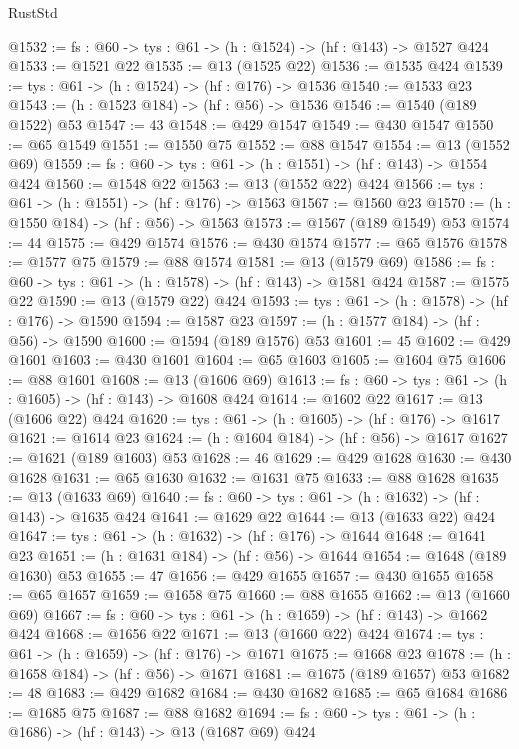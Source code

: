 \begin{lexlean}{RustStd}
\begin{coremodule}
@1532 := {fs : @60} -> {tys : @61} -> (h : @1524) -> (hf : @143) -> @1527 @424
@1533 := @1521 @22
@1535 := @13 (@1525 @22)
@1536 := @1535 @424
@1539 := {tys : @61} -> (h : @1524) -> (hf : @176) -> @1536
@1540 := @1533 @23
@1543 := (h : @1523 @184) -> (hf : @56) -> @1536
@1546 := @1540 (@189 @1522) @53
@1547 := 43
@1548 := @429 @1547
@1549 := @430 @1547
@1550 := @65 @1549
@1551 := @1550 @75
@1552 := @88 @1547
@1554 := @13 (@1552 @69)
@1559 := {fs : @60} -> {tys : @61} -> (h : @1551) -> (hf : @143) -> @1554 @424
@1560 := @1548 @22
@1563 := @13 (@1552 @22) @424
@1566 := {tys : @61} -> (h : @1551) -> (hf : @176) -> @1563
@1567 := @1560 @23
@1570 := (h : @1550 @184) -> (hf : @56) -> @1563
@1573 := @1567 (@189 @1549) @53
@1574 := 44
@1575 := @429 @1574
@1576 := @430 @1574
@1577 := @65 @1576
@1578 := @1577 @75
@1579 := @88 @1574
@1581 := @13 (@1579 @69)
@1586 := {fs : @60} -> {tys : @61} -> (h : @1578) -> (hf : @143) -> @1581 @424
@1587 := @1575 @22
@1590 := @13 (@1579 @22) @424
@1593 := {tys : @61} -> (h : @1578) -> (hf : @176) -> @1590
@1594 := @1587 @23
@1597 := (h : @1577 @184) -> (hf : @56) -> @1590
@1600 := @1594 (@189 @1576) @53
@1601 := 45
@1602 := @429 @1601
@1603 := @430 @1601
@1604 := @65 @1603
@1605 := @1604 @75
@1606 := @88 @1601
@1608 := @13 (@1606 @69)
@1613 := {fs : @60} -> {tys : @61} -> (h : @1605) -> (hf : @143) -> @1608 @424
@1614 := @1602 @22
@1617 := @13 (@1606 @22) @424
@1620 := {tys : @61} -> (h : @1605) -> (hf : @176) -> @1617
@1621 := @1614 @23
@1624 := (h : @1604 @184) -> (hf : @56) -> @1617
@1627 := @1621 (@189 @1603) @53
@1628 := 46
@1629 := @429 @1628
@1630 := @430 @1628
@1631 := @65 @1630
@1632 := @1631 @75
@1633 := @88 @1628
@1635 := @13 (@1633 @69)
@1640 := {fs : @60} -> {tys : @61} -> (h : @1632) -> (hf : @143) -> @1635 @424
@1641 := @1629 @22
@1644 := @13 (@1633 @22) @424
@1647 := {tys : @61} -> (h : @1632) -> (hf : @176) -> @1644
@1648 := @1641 @23
@1651 := (h : @1631 @184) -> (hf : @56) -> @1644
@1654 := @1648 (@189 @1630) @53
@1655 := 47
@1656 := @429 @1655
@1657 := @430 @1655
@1658 := @65 @1657
@1659 := @1658 @75
@1660 := @88 @1655
@1662 := @13 (@1660 @69)
@1667 := {fs : @60} -> {tys : @61} -> (h : @1659) -> (hf : @143) -> @1662 @424
@1668 := @1656 @22
@1671 := @13 (@1660 @22) @424
@1674 := {tys : @61} -> (h : @1659) -> (hf : @176) -> @1671
@1675 := @1668 @23
@1678 := (h : @1658 @184) -> (hf : @56) -> @1671
@1681 := @1675 (@189 @1657) @53
@1682 := 48
@1683 := @429 @1682
@1684 := @430 @1682
@1685 := @65 @1684
@1686 := @1685 @75
@1687 := @88 @1682
@1694 := {fs : @60} -> {tys : @61} -> (h : @1686) -> (hf : @143) -> @13 (@1687 @69) @424

\end{coremodule}
\end{lexlean}
